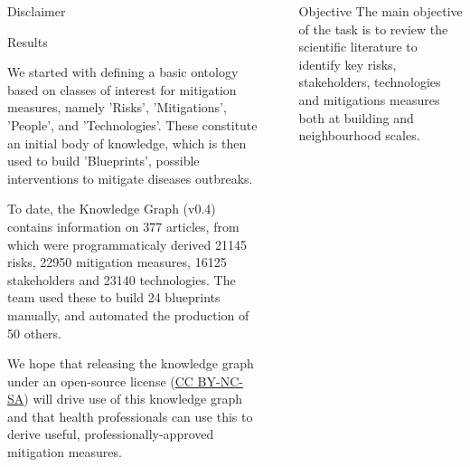 \documentclass[final]{beamer}
\newlength{\sepwid}
\newlength{\onecolwid}
\begin{document}
\begin{columns}[t]
\begin{column}{\onecolwid}
\begin{block}{Disclaimer}
          \end{block}

          
          
          \begin{block}{Results}

We started with defining a basic ontology based on classes of interest for mitigation measures, namely 'Risks', 'Mitigations', 'People', and 'Technologies'. These constitute an initial body of knowledge, which is then used to build 'Blueprints', possible interventions to mitigate diseases outbreaks. 

To date, the Knowledge Graph (v0.4) contains information on 377 articles, from which were programmaticaly derived 21145  risks, 22950  mitigation measures, 16125  stakeholders and 23140  technologies. The team used these to build 24 blueprints manually, and automated the production of 50 others.

We hope that releasing the knowledge graph under an open-source license  (\href{https://creativecommons.org/licenses/by-nc-sa/4.0/deed.en}{CC BY-NC-SA}) will drive use of this knowledge graph and that health professionals can use this to derive useful, professionally-approved mitigation measures.

          \end{block}
         
         \end{column}
                  
                  
         \begin{column}{\sepwid}  \end{column}
         
         
         
         
         \begin{column}{\onecolwid} %
                   
          \begin{block}{Objective}
The main objective of the task is to review the scientific literature to identify key risks, stakeholders, technologies and mitigations measures both at building and neighbourhood scales.


\end{block}
\end{column}
\end{columns}
\end{document}
